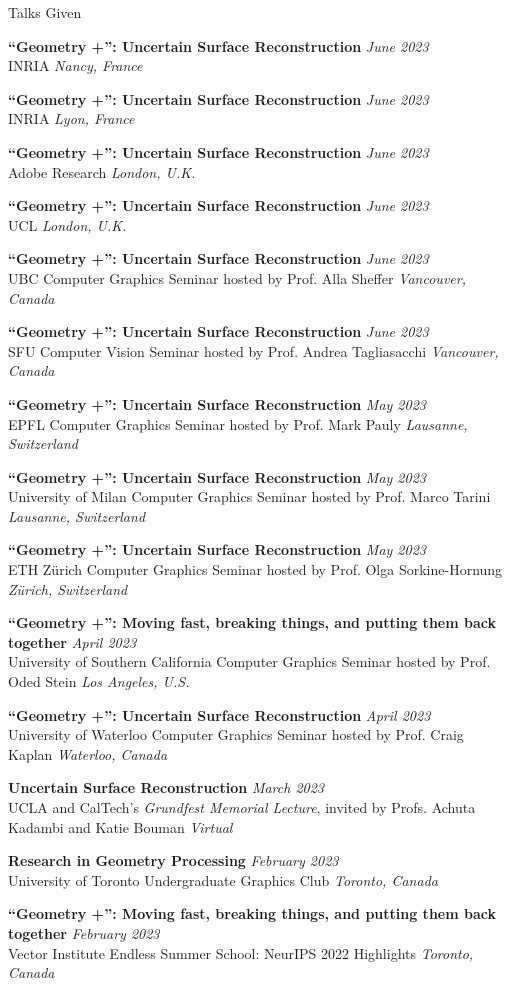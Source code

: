 \documentclass{resume}
\newcommand{\talk}[4]{
    {\bf #1} \hfill {\em \small #2} \\ %
    {\small #3} \hfill {\em \small #4}
}
\begin{document}
\begin{rSection}{Talks Given}



\talk{``Geometry +'': Uncertain Surface Reconstruction}{June 2023}{INRIA}{Nancy, France}

\talk{``Geometry +'': Uncertain Surface Reconstruction}{June 2023}{INRIA}{Lyon, France}

\talk{``Geometry +'': Uncertain Surface Reconstruction}{June 2023}{Adobe Research}{London, U.K.}

\talk{``Geometry +'': Uncertain Surface Reconstruction}{June 2023}{UCL}{London, U.K.}

\talk{``Geometry +'': Uncertain Surface Reconstruction}{June 2023}{UBC Computer Graphics Seminar hosted by Prof. Alla Sheffer}{Vancouver, Canada}

\talk{``Geometry +'': Uncertain Surface Reconstruction}{June 2023}{SFU Computer Vision Seminar hosted by Prof. Andrea Tagliasacchi}{Vancouver, Canada}

\talk{``Geometry +'': Uncertain Surface Reconstruction}{May 2023}{EPFL Computer Graphics Seminar hosted by Prof. Mark Pauly}{Lausanne, Switzerland}

\talk{``Geometry +'': Uncertain Surface Reconstruction}{May 2023}{University of Milan Computer Graphics Seminar hosted by Prof. Marco Tarini}{Lausanne, Switzerland}

\talk{``Geometry +'': Uncertain Surface Reconstruction}{May 2023}{ETH Z\"{u}rich Computer Graphics Seminar hosted by Prof. Olga Sorkine-Hornung}{Z\"{u}rich, Switzerland}

\talk{``Geometry +'': Moving fast, breaking things, and putting them back together}{April 2023}{University of Southern California Computer Graphics Seminar hosted by Prof. Oded Stein}{Los Angeles, U.S.}

\talk{``Geometry +'': Uncertain Surface Reconstruction}{April 2023}{University of Waterloo Computer Graphics Seminar hosted by Prof. Craig Kaplan}{Waterloo, Canada}

\talk{Uncertain Surface Reconstruction}{March 2023}{UCLA and CalTech's \textit{Grundfest Memorial Lecture}, invited by Profs. Achuta Kadambi and Katie Bouman}{Virtual}

\talk{Research in Geometry Processing}{February 2023}
{University of Toronto Undergraduate Graphics Club}{Toronto, Canada}

\talk{``Geometry +'': Moving fast, breaking things, and putting them back together}{February 2023}{Vector Institute Endless Summer School: NeurIPS 2022 Highlights}{Toronto, Canada}


\end{rSection}
\end{document}
